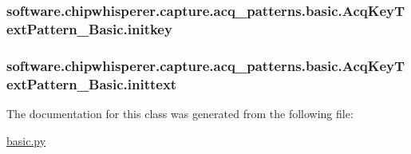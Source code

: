 \subsubsection[{initkey}]{\setlength{\rightskip}{0pt plus 5cm}software.\+chipwhisperer.\+capture.\+acq\+\_\+patterns.\+basic.\+Acq\+Key\+Text\+Pattern\+\_\+\+Basic.\+initkey}\label{classsoftware_1_1chipwhisperer_1_1capture_1_1acq__patterns_1_1basic_1_1AcqKeyTextPattern__Basic_a1f07994b453305f8d7c993c874d00897}
\hypertarget{classsoftware_1_1chipwhisperer_1_1capture_1_1acq__patterns_1_1basic_1_1AcqKeyTextPattern__Basic_ac021927c14f87274de7dd91f4f4b1adc}{}
\subsubsection[{inittext}]{\setlength{\rightskip}{0pt plus 5cm}software.\+chipwhisperer.\+capture.\+acq\+\_\+patterns.\+basic.\+Acq\+Key\+Text\+Pattern\+\_\+\+Basic.\+inittext}\label{classsoftware_1_1chipwhisperer_1_1capture_1_1acq__patterns_1_1basic_1_1AcqKeyTextPattern__Basic_ac021927c14f87274de7dd91f4f4b1adc}


The documentation for this class was generated from the following file\+:\begin{DoxyCompactItemize}
\item 
\hyperlink{basic_8py}{basic.\+py}\end{DoxyCompactItemize}
